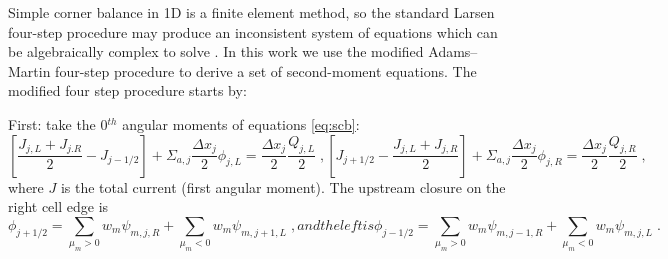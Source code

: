 Simple corner balance in 1D is a finite element method, so the standard Larsen four-step procedure may produce an inconsistent system of equations which can be algebraically complex to solve \cite{adams_fast_2002}.
In this work we use the modified Adams--Martin four-step procedure \cite{adams_1992_dsadfe} to derive a set of second-moment equations.
The modified four step procedure starts by:

{First:} take the 0$^{th}$ angular moments of equations \eqref{eq:scb}:
\begin{subequations}
\label{eq:zeroth}
\begin{equation}
\label{eq:zeroth_left}
    \left[ \frac{J_{j,L} + J_{j.R}}{2} - J_{j-1/2} \right] + \Sigma_{a,j} \frac{\Delta x_j}{2} \phi_{j,L} = \frac{\Delta x_j}{2} \frac{Q_{j,L}}{2} \; ,
\end{equation}
\begin{equation}
     \left[ J_{j+1/2} - \frac{J_{j,L} + J_{j,R}}{2} \right] + \Sigma_{a,j} \frac{\Delta x_j}{2} \phi_{j,R} = \frac{\Delta x_j}{2} \frac{Q_{j,R}}{2} \; ,
\end{equation}
\end{subequations}
where $J$ is the total current (first angular moment). The upstream closure on the right cell edge is
\begin{subequations}
\label{edgescalar}
\begin{equation}
   \phi_{j+1/2} = \sum\limits_{\mu_{m}>0} w_m   \psi_{m,j,R}+\sum\limits_{\mu_{m}<0} w_m \psi_{m,j+1,L} \;,
\end{equation}
and the left is
\begin{equation}
   \phi_{j-1/2} = \sum\limits_{\mu_{m}>0} w_m   \psi_{m,j-1,R}+\sum\limits_{\mu_{m}<0} w_m \psi_{m,j,L} \;.
\end{equation}
\end{subequations}

